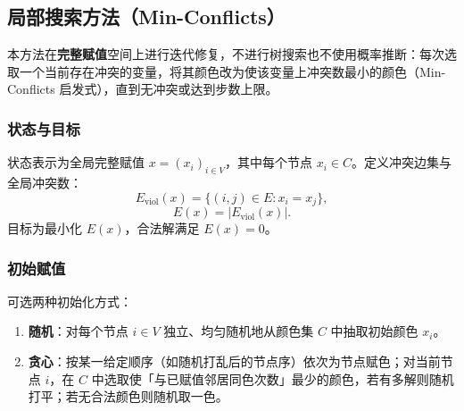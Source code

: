 

\subsection{局部搜索方法（Min-Conflicts）}
\label{sec:local-search}

本方法在\textbf{完整赋值}空间上进行迭代修复，不进行树搜索也不使用概率推断：每次选取一个当前存在冲突的变量，将其颜色改为使该变量上冲突数最小的颜色（Min-Conflicts 启发式），直到无冲突或达到步数上限。

\subsubsection{状态与目标}
\label{sec:mc-state}

状态表示为全局完整赋值 $x = (x_i)_{i\in V}$，其中每个节点 $x_i \in C$。定义冲突边集与全局冲突数：
\begin{equation}
  E_{\mathrm{viol}}(x) = \bigl\{ (i,j) \in E : x_i = x_j \bigr\},
\end{equation}
\begin{equation}
  E(x) = \bigl| E_{\mathrm{viol}}(x) \bigr|.
\end{equation}
目标为最小化 $E(x)$，合法解满足 $E(x) = 0$。

\subsubsection{初始赋值}
\label{sec:mc-init}

可选两种初始化方式：
\begin{enumerate}
  \item \textbf{随机}：对每个节点 $i \in V$ 独立、均匀随机地从颜色集 $C$ 中抽取初始颜色 $x_i$。
  \item \textbf{贪心}：按某一给定顺序（如随机打乱后的节点序）依次为节点赋色；对当前节点 $i$，在 $C$ 中选取使「与已赋值邻居同色次数」最少的颜色，若有多解则随机打平；若无合法颜色则随机取一色。
\end{enumerate}

